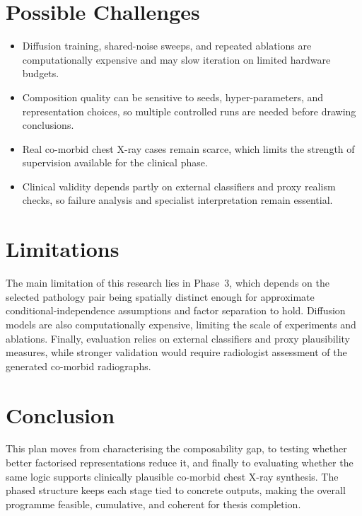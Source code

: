 \section{Possible Challenges}
\vspace{-0.35em}
\begin{itemize}[leftmargin=1.4em,itemsep=0.2em,topsep=0.25em,parsep=0pt,partopsep=0pt]
    \item Diffusion training, shared-noise sweeps, and repeated ablations are computationally expensive and may slow iteration on limited hardware budgets.
    \item Composition quality can be sensitive to seeds, hyper-parameters, and representation choices, so multiple controlled runs are needed before drawing conclusions.
    \item Real co-morbid chest X-ray cases remain scarce, which limits the strength of supervision available for the clinical phase.
    \item Clinical validity depends partly on external classifiers and proxy realism checks, so failure analysis and specialist interpretation remain essential.
\end{itemize}
\vspace{-0.8em}
\section{Limitations}
\vspace{-0.35em}
The main limitation of this research lies in Phase~3, which depends on the selected pathology pair being spatially distinct enough for approximate conditional-independence assumptions and factor separation to hold. Diffusion models are also computationally expensive, limiting the scale of experiments and ablations. Finally, evaluation relies on external classifiers and proxy plausibility measures, while stronger validation would require radiologist assessment of the generated co-morbid radiographs.
\section{Conclusion}
\vspace{-0.35em}
This plan moves from characterising the composability gap, to testing whether better factorised representations reduce it, and finally to evaluating whether the same logic supports clinically plausible co-morbid chest X-ray synthesis. The phased structure keeps each stage tied to concrete outputs, making the overall programme feasible, cumulative, and coherent for thesis completion.
\endgroup

